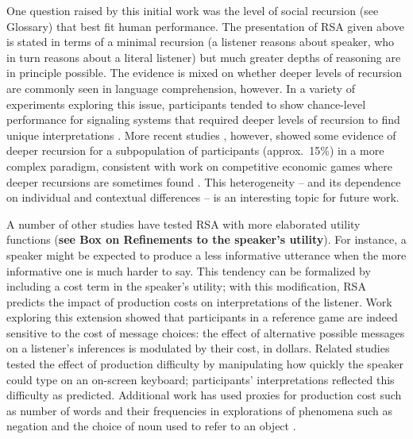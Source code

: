 \documentclass[]{elsarticle}
\begin{document}
One question raised by this initial work was the level of social recursion (see Glossary) that
best fit human performance. The presentation of RSA given above is
stated in terms of a minimal recursion (a listener reasons about
speaker, who in turn reasons about a literal listener) but much greater
depths of reasoning are in principle possible. The evidence is mixed on whether deeper levels of recursion are commonly seen in language comprehension, however. In a variety of experiments exploring this issue, participants tended to show chance-level performance for signaling systems that required deeper levels of
recursion to find unique interpretations \citep{stiller2011,degen2012,vogel2013}. More recent studies \citep{franke2016},
however, showed some evidence of deeper recursion
for a subpopulation of participants (approx.~15\%) in a more
complex paradigm, consistent with work on competitive economic
games where deeper recursions are sometimes found \citep{camerer2004}. This heterogeneity -- and its dependence
on individual and contextual differences -- is an interesting topic for
future work.

A number of other studies have tested RSA with more elaborated utility functions (\textbf{see Box on Refinements to the speaker’s utility}). For instance, a speaker might be expected to
produce a less informative utterance when the more informative one is
much harder to say. This tendency can be formalized by including a cost
term in the speaker's utility; with this modification, RSA
predicts the impact of production costs on interpretations of the
listener. Work exploring this extension \citep{bergen2012} showed that participants in a reference
game are indeed sensitive to the cost of
message choices: the effect of alternative possible messages on a listener's inferences is modulated by their cost, in dollars. Related studies \citep{degen2013} tested the effect of production
difficulty by manipulating how quickly the speaker could type on an
on-screen keyboard; participants' interpretations reflected this difficulty
as predicted. Additional work has used proxies for production cost
such as number of words and their frequencies in explorations of phenomena such as negation \citep{nordmeyer2014} and the choice of noun used to refer to an object \citep{graf2016}.
\end{document}
